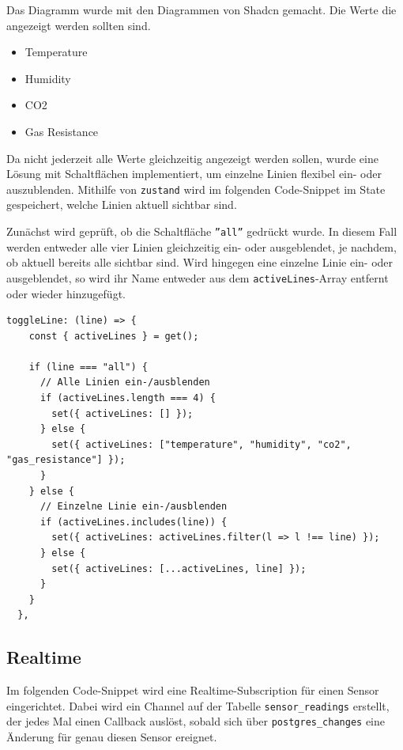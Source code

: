 \begin{inhalt}
\begin{enumerate}[label=\textbf{\arabic*.}]
Das Diagramm wurde mit den Diagrammen von Shadcn gemacht. Die Werte die angezeigt werden sollten sind.

\begin{itemize}
    \item Temperature

    \item Humidity

    \item CO2

    \item Gas Resistance
\end{itemize}

Da nicht jederzeit alle Werte gleichzeitig angezeigt werden sollen, wurde eine Lösung mit Schaltflächen implementiert, um einzelne Linien flexibel ein- oder auszublenden.
Mithilfe von \texttt{zustand} wird im folgenden Code-Snippet im State gespeichert, welche Linien aktuell sichtbar sind.

\newpage
Zunächst wird geprüft, ob die Schaltfläche \texttt{''all''} gedrückt wurde. In diesem Fall werden entweder alle vier Linien gleichzeitig ein- oder ausgeblendet, je nachdem, ob aktuell bereits alle sichtbar sind.
Wird hingegen eine einzelne Linie ein- oder ausgeblendet, so wird ihr Name entweder aus dem \texttt{activeLines}-Array entfernt oder wieder hinzugefügt.

\begin{lstlisting}[language=mytsx]
toggleLine: (line) => {
    const { activeLines } = get();
    
    if (line === "all") {
      // Alle Linien ein-/ausblenden
      if (activeLines.length === 4) {
        set({ activeLines: [] });
      } else {
        set({ activeLines: ["temperature", "humidity", "co2", "gas_resistance"] });
      }
    } else {
      // Einzelne Linie ein-/ausblenden
      if (activeLines.includes(line)) {
        set({ activeLines: activeLines.filter(l => l !== line) });
      } else {
        set({ activeLines: [...activeLines, line] });
      }
    }
  },
\end{lstlisting}




\newpage


\subsection{Realtime}
\label{ref:realtime-sensor}

Im folgenden Code-Snippet wird eine Realtime-Subscription für einen Sensor eingerichtet.  
Dabei wird ein Channel auf der Tabelle \texttt{sensor\_readings} erstellt, der jedes Mal einen Callback auslöst, sobald sich über \texttt{postgres\_changes} eine Änderung für genau diesen Sensor ereignet.


\end{enumerate}
\end{inhalt}
